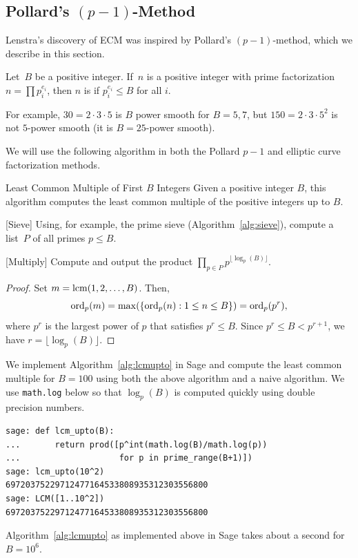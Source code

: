 \subsection{Pollard's $(p-1)$-Method}\label{sec:pollard}
Lenstra's discovery of ECM was inspired by
Pollard's $(p-1)$-method, which we describe in this section.
\begin{definition}%
   Let~$B$ be a positive
  integer. If~$n$ is a positive integer with prime factorization
  $n=\prod p_i^{e_i}$, then $n$ is  if
  $p_i^{e_i}\leq B$ for all $i$.
\end{definition}
For example, $30=2\cdot 3\cdot 5$ is $B$ power smooth for $B=5, 7$, but
$150=2\cdot 3 \cdot 5^2$ is not $5$-power smooth (it is $B=25$-power
smooth).

We will use the following algorithm in both the Pollard $p-1$
and elliptic curve factorization methods.
\begin{algorithm}{Least Common Multiple of First $B$ Integers}
\label{alg:lcmupto}
Given a positive integer $B$, this algorithm computes the least
common multiple of the positive integers up to $B$.
\begin{steps}
\item{}[Sieve] Using, for example, the prime sieve
  (Algorithm~\ref{alg:sieve}), compute a list~$P$ of all primes $p\leq
  B$.
\item{}[Multiply]
Compute and output the product $\prod_{p\in P} p^{\lfloor \log_p(B) \rfloor}$.
\end{steps}
\end{algorithm}
\begin{proof}
Set $m=\operatorname{lcm}(1,2,\ldots, B)$.  Then,
$$
  \operatorname{ord}_p(m) = \max(\{\operatorname{ord}_p(n) : 1 \leq n \leq B\}) = \operatorname{ord}_p(p^r),
$$
where $p^r$ is the largest power of $p$ that satisfies $p^r\leq B$.
Since $p^r\leq B < p^{r+1}$, we have $r=\lfloor \log_p(B) \rfloor$.
\end{proof}

\begin{sg}
  We implement Algorithm~\ref{alg:lcmupto} in Sage and compute the
  least common multiple for $B=100$ using both the above algorithm and
  a naive algorithm.  We use {\tt math.log} below so that $\log_p(B)$
  is computed quickly using double precision numbers.
\begin{verbatim}
sage: def lcm_upto(B):
...       return prod([p^int(math.log(B)/math.log(p))
...                    for p in prime_range(B+1)])
sage: lcm_upto(10^2)
69720375229712477164533808935312303556800
sage: LCM([1..10^2])
69720375229712477164533808935312303556800
\end{verbatim}
Algorithm~\ref{alg:lcmupto} as implemented above in Sage takes about a
second for $B=10^6$.
\end{sg}

